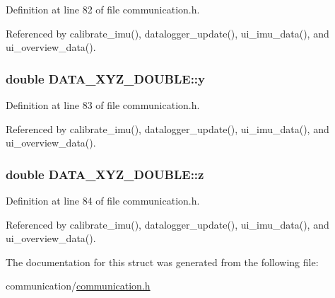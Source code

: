 Definition at line 82 of file communication.\-h.



Referenced by calibrate\-\_\-imu(), datalogger\-\_\-update(), ui\-\_\-imu\-\_\-data(), and ui\-\_\-overview\-\_\-data().

\hypertarget{structDATA__XYZ__DOUBLE_a198a27b5df3b5b0bf461b0e481e22a82}{
\subsubsection[{y}]{\setlength{\rightskip}{0pt plus 5cm}double D\-A\-T\-A\-\_\-\-X\-Y\-Z\-\_\-\-D\-O\-U\-B\-L\-E\-::y}}\label{structDATA__XYZ__DOUBLE_a198a27b5df3b5b0bf461b0e481e22a82}


Definition at line 83 of file communication.\-h.



Referenced by calibrate\-\_\-imu(), datalogger\-\_\-update(), ui\-\_\-imu\-\_\-data(), and ui\-\_\-overview\-\_\-data().

\hypertarget{structDATA__XYZ__DOUBLE_a9556e8868c223ff3e28756ea18a284c0}{
\subsubsection[{z}]{\setlength{\rightskip}{0pt plus 5cm}double D\-A\-T\-A\-\_\-\-X\-Y\-Z\-\_\-\-D\-O\-U\-B\-L\-E\-::z}}\label{structDATA__XYZ__DOUBLE_a9556e8868c223ff3e28756ea18a284c0}


Definition at line 84 of file communication.\-h.



Referenced by calibrate\-\_\-imu(), datalogger\-\_\-update(), ui\-\_\-imu\-\_\-data(), and ui\-\_\-overview\-\_\-data().



The documentation for this struct was generated from the following file\-:\begin{DoxyCompactItemize}
\item 
communication/\hyperlink{communication_2communication_8h}{communication.\-h}\end{DoxyCompactItemize}
